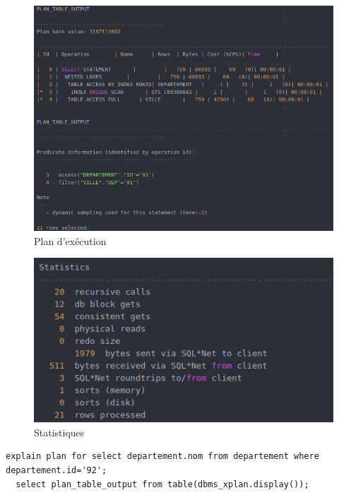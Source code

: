 \documentclass[a4paper,12pt]{article}
\begin{document}
\begin{figure}[!ht]
  \centering
  \includegraphics[scale=0.6]{images/q7_1.png}
  \caption{Plan d'exécution}
\end{figure}

\begin{figure}[!ht]
  \centering
  \includegraphics[scale=0.6]{images/q7_2.png}
  \caption{Statistiques}
\end{figure}

\begin{lstlisting}[caption={requêtes permettant d'expliquer le plan d'exécution affichant le nom du département dont le numéro est 92}, label={lst:question_7.2}]
  explain plan for select departement.nom from departement where departement.id='92';
  select plan_table_output from table(dbms_xplan.display());
\end{lstlisting}
\end{document}
